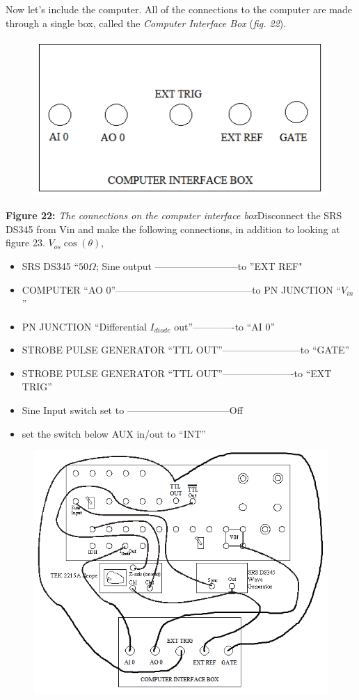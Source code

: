 \documentclass{../lab}
\begin{document}
Now let's include the computer. All of the connections to the computer are made through a single box, called the \emph{Computer Interface Box} (\emph{fig. 22}).


\begin{figure}[h]
    \centering
    \href{http://experimentationlab.berkeley.edu/sites/default/files/images/NLD_DAQBOX.png}{\includegraphics[width=0.5\linewidth]{images/NLD_DAQBOX.png}}
    \caption{}
    \label{fig:NLD_DAQBOX}
\end{figure}

\textbf{Figure 22:} \emph{The connections on the computer interface box}Disconnect the SRS DS345 from Vin and make the following connections, in addition to looking at figure 23. $ V_{os}\cos {(\theta)} $,

\begin{itemize}
    \item SRS DS345 ``$ 50 \Omega $; Sine output --------------------------to ''EXT REF"

    \item COMPUTER ``AO 0''------------------------------------------to PN JUNCTION ``$V_{in}$''

    \item PN JUNCTION ``Differential $I_{diode}$ out''-------------to ``AI 0''

    \item STROBE PULSE GENERATOR ``TTL OUT''------------------------to ``GATE''

    \item STROBE PULSE GENERATOR ``TTL OUT''----------------------to ``EXT TRIG''

    \item Sine Input switch set to --------------------------------Off

    \item set the switch below AUX in/out to ``INT''

\end{itemize}


\begin{figure}[h]
    \centering
    \href{http://experimentationlab.berkeley.edu/sites/default/files/images/NLD_PN_DIAGRAM.png}{\includegraphics[width=0.5\linewidth]{images/NLD_PN_DIAGRAM.png}}
    \caption{}
    \label{fig:NLD_PN_DIAGRAM}
\end{figure}
\end{document}
